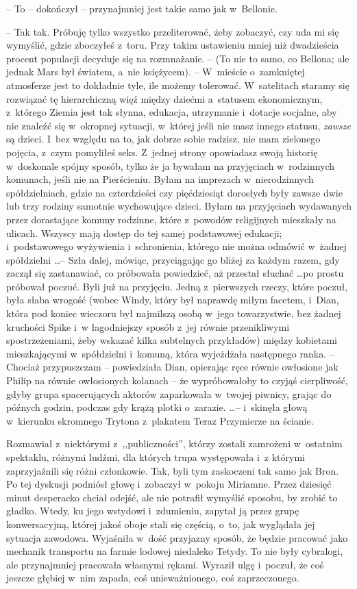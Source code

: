 \documentclass[oneside,polish,11pt,rmheadings]{mwbk}
\begin{document}
-- To -- dokończył -- przynajmniej jest takie samo jak w~Bellonie. 

-- Tak tak. Próbuję tylko wszystko przeliterować, żeby zobaczyć, czy uda mi się wymyślić, gdzie zboczyłeś z~toru.  Przy takim ustawieniu mniej niż dwadzieścia procent populacji decyduje się na rozmnażanie. -- (To nie to samo, co Bellona; ale jednak Mars był światem, a~nie księżycem). -- W~mieście o~zamkniętej atmosferze jest to dokładnie tyle, ile możemy tolerować. W~satelitach staramy się rozwiązać tę hierarchiczną więź między dziećmi a~statusem ekonomicznym, z~którego Ziemia jest tak słynna, edukacja, utrzymanie i~dotacje socjalne, aby nie znaleźć się w~okropnej sytuacji, w~której jeśli nie masz innego statusu, \textit{zawsze} są dzieci. I~bez względu na to, jak dobrze sobie radzisz, nie mam zielonego pojęcia, z~czym pomyliłeś seks. Z~jednej strony opowiadasz swoją historię w~doskonale spójny sposób, tylko że ja bywałam na przyjęciach w~rodzinnych komunach, jeśli nie na Pierścieniu. Byłam na imprezach w~nierodzinnych spółdzielniach, gdzie na czterdzieści czy pięćdziesiąt dorosłych były zawsze dwie lub trzy rodziny samotnie wychowujące dzieci. Byłam na przyjęciach wydawanych przez dorastające komuny rodzinne, które z~powodów religijnych mieszkały na ulicach. Wszyscy mają dostęp do tej samej podstawowej edukacji; i~podstawowego wyżywienia i~schronienia, którego nie można odmówić w~żadnej spółdzielni \ldots  -- Szła dalej, mówiąc, przyciągając go bliżej za każdym razem, gdy zaczął się zastanawiać, co próbowała powiedzieć, aż przestał słuchać \ldots  po prostu próbował poczuć. Byli już na przyjęciu. Jedną z~pierwszych rzeczy, które poczuł, była słaba wrogość (wobec Windy, który był naprawdę miłym facetem, i~Dian, która pod koniec wieczoru był najmilszą osobą w~jego towarzystwie, bez żadnej kruchości Spike i~w łagodniejszy sposób z~jej równie przenikliwymi spostrzeżeniami, żeby wskazać kilka subtelnych przykładów) między kobietami mieszkającymi w~spółdzielni i~komuną, która wyjeżdżała następnego ranka. -- Chociaż przypuszczam -- powiedziała Dian, opierając ręce równie owłosione jak Philip na równie owłosionych kolanach -- że wypróbowałoby to czyjąś cierpliwość, gdyby grupa spacerujących aktorów zaparkowała w~twojej piwnicy, grając do późnych godzin, podczas gdy krążą plotki o~zarazie.  \ldots  -- i~skinęła głową w~kierunku skromnego Trytona z~plakatem Teraz Przymierze na ścianie. 

Rozmawiał z~niektórymi z~,,publiczności'', którzy zostali zamrożeni w~ostatnim spektaklu, różnymi ludźmi, dla których trupa występowała i~z którymi zaprzyjaźnili się różni członkowie. Tak, byli tym zaskoczeni tak samo jak Bron. Po tej dyskusji podniósł głowę i~zobaczył w~pokoju Miriamne. Przez dziesięć minut desperacko chciał odejść, ale nie potrafił wymyślić sposobu, by zrobić to gładko. Wtedy, ku jego wstydowi i~zdumieniu, zapytał ją przez grupę konwersacyjną, której jakoś oboje stali się częścią, o~to, jak wyglądała jej sytuacja zawodowa. Wyjaśniła w~dość przyjazny sposób, że będzie pracować jako mechanik transportu na farmie lodowej niedaleko Tetydy. To nie były cybralogi, ale przynajmniej pracowała własnymi rękami. Wyraził ulgę i~poczuł, że coś jeszcze głębiej w~nim zapada, coś unieważnionego, coś zaprzeczonego. 
\end{document}
